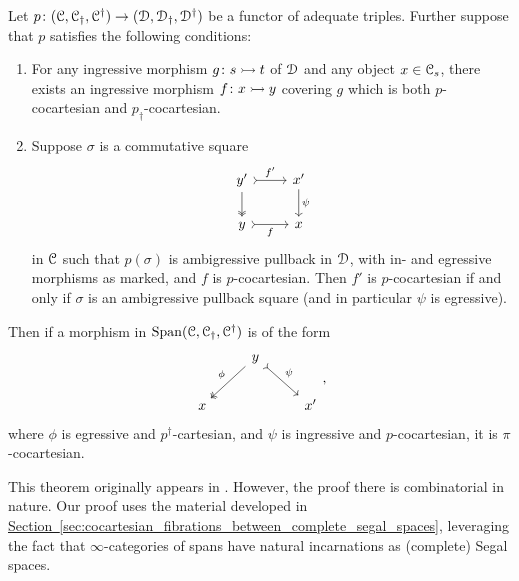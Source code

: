 \documentclass[main.tex]{subfiles}
\begin{document}
\begin{theorem}
  \label{thm:main}
  Let $p\colon (\mathcal{C}, \mathcal{C}_{\dagger}, \mathcal{C}^{\dagger}) \to (\mathcal{D}, \mathcal{D}_{\dagger}, \mathcal{D}^{\dagger})$ be a functor of adequate triples. Further suppose that $p$ satisfies the following conditions:
  \begin{enumerate}
    \item For any ingressive morphism $g\colon s \rightarrowtail t$ of $\mathcal{D}$ and any object $x \in \mathcal{C}_{s}$, there exists an ingressive morphism $f\colon x \rightarrowtail y$ covering $g$ which is both $p$-cocartesian and $p_{\dagger}$-cocartesian.

    \item Suppose $\sigma$ is a commutative square
      \begin{equation*}
        \begin{tikzcd}
          y'
          \arrow[r, rightarrowtail, "f'"]
          \arrow[d, two heads]
          & x'
          \arrow[d, "\psi"]
          \\
          y
          \arrow[r, rightarrowtail, swap, "f"]
          & x
        \end{tikzcd}
      \end{equation*}
      in $\mathcal{C}$ such that $p(\sigma)$ is ambigressive pullback in $\mathcal{D}$, with in- and egressive morphisms as marked, and $f$ is $p$-cocartesian. Then $f'$ is $p$-cocartesian if and only if $\sigma$ is an ambigressive pullback square (and in particular $\psi$ is egressive).
  \end{enumerate}

  Then if a morphism in $\mathrm{Span}(\mathcal{C}, \mathcal{C}_{\dagger}, \mathcal{C}^{\dagger})$ is of the form
  \begin{equation*}
    \begin{tikzcd}
      & y
      \arrow[dl, two heads, swap, "\phi"]
      \arrow[dr, rightarrowtail, "\psi"]
      \\
      x
      && x'
    \end{tikzcd},
  \end{equation*}
  where $\phi$ is egressive and $p^{\dagger}$-cartesian, and $\psi$ is ingressive and $p$-cocartesian, it is $\pi$-cocartesian.%
\end{theorem}

This theorem originally appears in \cite{spectralmackeyfunctors1}. However, the proof there is combinatorial in nature. Our proof uses the material developed in \hyperref[sec:cocartesian_fibrations_between_complete_segal_spaces]{Section~\ref*{sec:cocartesian_fibrations_between_complete_segal_spaces}}, leveraging the fact that $\infty$-categories of spans have natural incarnations as (complete) Segal spaces.
\end{document}
